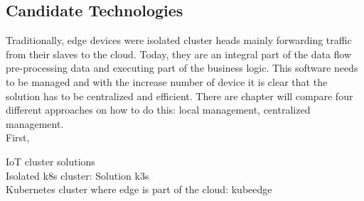 \subsection{Candidate Technologies}
Traditionally, edge devices were isolated cluster heads mainly forwarding traffic from their slaves to the cloud. Today, they are an integral part of the data flow pre-processing data and executing part of the business logic. This software needs to be managed and with the increase number of device it is clear that the solution has to be centralized and efficient. There are  chapter will compare four different approaches on how to do this: local management, centralized management. \\
First,

IoT cluster solutions\\
Isolated k8s cluster: Solution k3s\\
Kubernetes cluster where edge is part of the cloud: kubeedge\\
